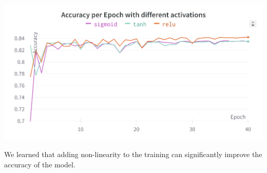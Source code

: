\includegraphics[scale=0.12]{q5/different_activations.png}

We learned that adding non-linearity to the training can significantly improve the accuracy of the model.